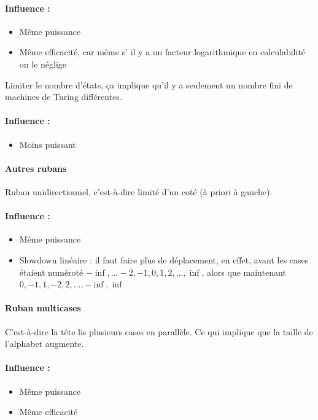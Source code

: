 \paragraph{Influence :} 
\begin{itemize}
	\item Même puissance
	\item Même efficacité, car même s’ il y a un facteur logarithmique en 
		calculabilité on le néglige
\end{itemize}

Limiter le nombre d'états, ça implique qu'il y a seulement un nombre fini de 
machines de Turing différentes.

\paragraph{Influence :} 
\begin{itemize}
	\item Moins puissant
\end{itemize}

\paragraph{Autres rubans}

Ruban unidirectionnel, c'est-à-dire limité d'un coté (à priori à gauche).

\paragraph{Influence :} 
\begin{itemize}
	\item Même puissance
	\item Slowdown linéaire : il faut faire plus de déplacement, en 
		effet, avant les cases étaient numéroté 
		$-\inf,...-2,-1,0,1,2,...,\inf$, alors que maintenant
	       	$0,-1,1,-2,2,...,-\inf,\inf$ 
\end{itemize}

\paragraph{Ruban multicases}C'est-à-dire la tête lis plusieurs cases en parallèle. Ce qui 
implique que la taille de l'alphabet augmente.

\paragraph{Influence :} 
\begin{itemize}
	\item Même puissance
	\item Même efficacité
\end{itemize}

